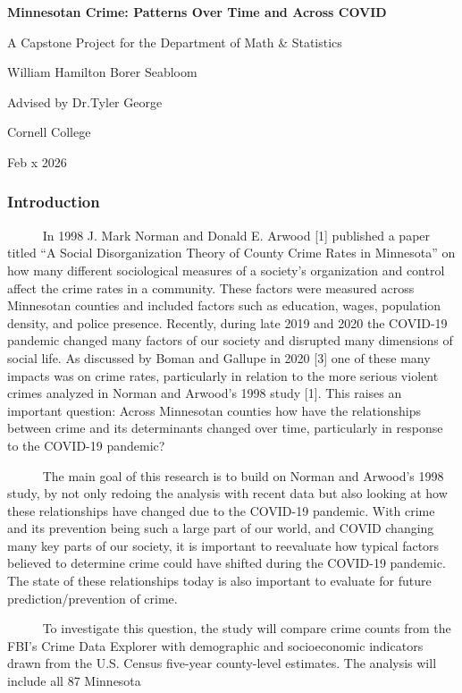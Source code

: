 \documentclass[
  11pt,
  letterpaper,
  DIV=11,
  numbers=noendperiod]{scrartcl}
\author{}
\date{}
\begin{document}
\textbf{Minnesotan Crime: Patterns Over Time and Across COVID}

A Capstone Project for the Department of Math \& Statistics

William Hamilton Borer Seabloom

Advised by Dr.Tyler George

Cornell College

Feb x 2026

\subsubsection{Introduction}\label{introduction}

~~~~~ In 1998 J. Mark Norman and Donald E. Arwood {[}1{]} published a
paper titled ``A Social Disorganization Theory of County Crime Rates in
Minnesota'' on how many different sociological measures of a society's
organization and control affect the crime rates in a community. These
factors were measured across Minnesotan counties and included factors
such as education, wages, population density, and police presence.
Recently, during late 2019 and 2020 the COVID-19 pandemic changed many
factors of our society and disrupted many dimensions of social life. As
discussed by Boman and Gallupe in 2020 {[}3{]} one of these many impacts
was on crime rates, particularly in relation to the more serious violent
crimes analyzed in Norman and Arwood's 1998 study {[}1{]}. This raises
an important question: Across Minnesotan counties how have the
relationships between crime and its determinants changed over time,
particularly in response to the COVID-19 pandemic?\\
\strut ~~~~~ The main goal of this research is to build on Norman and
Arwood's 1998 study, by not only redoing the analysis with recent data
but also looking at how these relationships have changed due to the
COVID-19 pandemic. With crime and its prevention being such a large part
of our world, and COVID changing many key parts of our society, it is
important to reevaluate how typical factors believed to determine crime
could have shifted during the COVID-19 pandemic. The state of these
relationships today is also important to evaluate for future
prediction/prevention of crime.\\
\strut ~~~~~ To investigate this question, the study will compare crime
counts from the FBI's Crime Data Explorer with demographic and
socioeconomic indicators drawn from the U.S. Census five-year
county-level estimates. The analysis will include all 87 Minnesota
\end{document}

